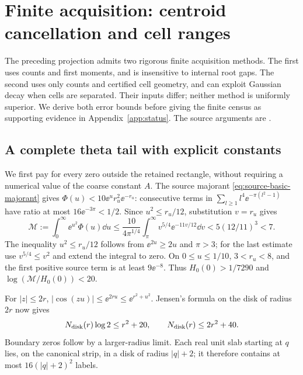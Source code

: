 \section{Finite acquisition: centroid cancellation and cell ranges}\label{sec:acquisition}

The preceding projection admits two rigorous finite acquisition methods.
The first uses counts and first moments, and is insensitive to internal
root gaps. The second uses only counts and certified cell geometry, and
can exploit Gaussian decay when cells are separated. Their inputs differ;
neither method is uniformly superior. We derive both error bounds before
giving the finite census as supporting evidence in
Appendix~\ref{app:status}. The source arguments are
\cite{OCCentroids,OCCellRanges}.

\subsection{A complete theta tail with explicit constants}

We first pay for every zero outside the retained rectangle, without
requiring a numerical value of the coarse constant $A$.
The source majorant \eqref{eq:source-basic-majorant} gives
$\Phi(u)<10\ee^u r_u^2\ee^{-r_u}$: consecutive terms in
$\sum_{l\ge1}l^4\ee^{-\pi(l^2-1)}$ have ratio at most
$16\ee^{-3\pi}<1/2$.
Since $u^2\le r_u/12$, substitution $v=r_u$ gives
\begin{equation}\label{eq:explicit-source-majorant}
 \mathcal M:=\int_0^\infty\ee^{u^2}\Phi(u)\dd u
 \le\frac{10}{4\pi^{1/4}}\int_\pi^\infty v^{5/4}\ee^{-11v/12}\dd v
 <5(12/11)^3<7.
\end{equation}
The inequality $u^2\le r_u/12$ follows from $\ee^{2u}\ge2u$ and
$\pi>3$; for the last estimate use $v^{5/4}\le v^2$ and extend the
integral to zero. On $0\le u\le1/10$, $3<r_u<8$, and the first
positive source term is at least $9\ee^{-8}$. Thus
$H_0(0)>1/7290$ and $\log(\mathcal M/H_0(0))<20$.

For $|z|\le2r$, $|\cos(zu)|\le\ee^{2ru}\le\ee^{r^2+u^2}$.
Jensen's formula on the disk of radius $2r$ now gives
\begin{equation}\label{eq:global-count-jensen}
 N_{\rm disk}(r)\log2\le r^2+20,
 \qquad N_{\rm disk}(r)\le2r^2+40.
\end{equation}
Boundary zeros follow by a larger-radius limit. Each real unit slab
starting at $q$ lies, on the canonical strip, in a disk of radius
$|q|+2$; it therefore contains at most $16(|q|+2)^2$ labels.

